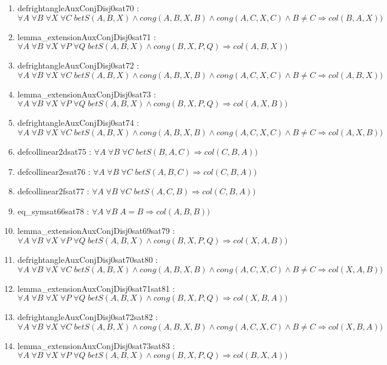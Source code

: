 \documentclass{article}
\begin{document}
\begin{enumerate}
\item defrightangleAuxConjDisj0sat70 : $\forall A\;\forall B\;\forall X\;\forall C\;betS(A, B, X)\wedge cong(A, B, X, B)\wedge cong(A, C, X, C)\wedge B \neq C \Rightarrow col(B, A, X))$
\item lemma\_extensionAuxConjDisj0sat71 : $\forall A\;\forall B\;\forall X\;\forall P\;\forall Q\;betS(A, B, X)\wedge cong(B, X, P, Q) \Rightarrow col(A, B, X))$
\item defrightangleAuxConjDisj0sat72 : $\forall A\;\forall B\;\forall X\;\forall C\;betS(A, B, X)\wedge cong(A, B, X, B)\wedge cong(A, C, X, C)\wedge B \neq C \Rightarrow col(A, B, X))$
\item lemma\_extensionAuxConjDisj0sat73 : $\forall A\;\forall B\;\forall X\;\forall P\;\forall Q\;betS(A, B, X)\wedge cong(B, X, P, Q) \Rightarrow col(A, X, B))$
\item defrightangleAuxConjDisj0sat74 : $\forall A\;\forall B\;\forall X\;\forall C\;betS(A, B, X)\wedge cong(A, B, X, B)\wedge cong(A, C, X, C)\wedge B \neq C \Rightarrow col(A, X, B))$
\item defcollinear2dsat75 : $\forall A\;\forall B\;\forall C\;betS(B, A, C) \Rightarrow col(C, B, A))$
\item defcollinear2esat76 : $\forall A\;\forall B\;\forall C\;betS(A, B, C) \Rightarrow col(C, B, A))$
\item defcollinear2fsat77 : $\forall A\;\forall B\;\forall C\;betS(A, C, B) \Rightarrow col(C, B, A))$
\item eq\_symsat66sat78 : $\forall A\;\forall B\;A = B \Rightarrow col(A, B, B))$
\item lemma\_extensionAuxConjDisj0sat69sat79 : $\forall A\;\forall B\;\forall X\;\forall P\;\forall Q\;betS(A, B, X)\wedge cong(B, X, P, Q) \Rightarrow col(X, A, B))$
\item defrightangleAuxConjDisj0sat70sat80 : $\forall A\;\forall B\;\forall X\;\forall C\;betS(A, B, X)\wedge cong(A, B, X, B)\wedge cong(A, C, X, C)\wedge B \neq C \Rightarrow col(X, A, B))$
\item lemma\_extensionAuxConjDisj0sat71sat81 : $\forall A\;\forall B\;\forall X\;\forall P\;\forall Q\;betS(A, B, X)\wedge cong(B, X, P, Q) \Rightarrow col(X, B, A))$
\item defrightangleAuxConjDisj0sat72sat82 : $\forall A\;\forall B\;\forall X\;\forall C\;betS(A, B, X)\wedge cong(A, B, X, B)\wedge cong(A, C, X, C)\wedge B \neq C \Rightarrow col(X, B, A))$
\item lemma\_extensionAuxConjDisj0sat73sat83 : $\forall A\;\forall B\;\forall X\;\forall P\;\forall Q\;betS(A, B, X)\wedge cong(B, X, P, Q) \Rightarrow col(B, X, A))$

\end{enumerate}
\end{document}
